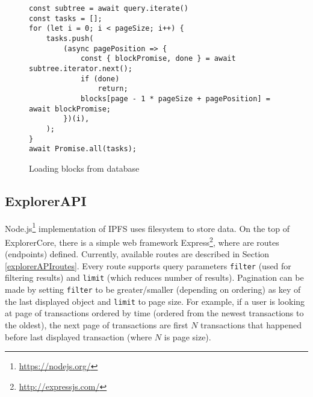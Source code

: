 \begin{figure}[h]
    \centering
    \begin{lstlisting}[style=ES6]
const subtree = await query.iterate()
const tasks = [];
for (let i = 0; i < pageSize; i++) {
    tasks.push(
        (async pagePosition => {
            const { blockPromise, done } = await subtree.iterator.next();
            if (done)
                return;
            blocks[page - 1 * pageSize + pagePosition] = await blockPromise;
        })(i),
    );
}
await Promise.all(tasks);
    \end{lstlisting}
    \caption{Loading blocks from database}
    \label{blocksLoading}
\end{figure}



\subsection{ExplorerAPI}
Node.js\footnote{\url{https://nodejs.org/}} implementation of IPFS uses filesystem to store data. On the top of ExplorerCore, there is a simple web framework Express\footnote{\url{http://expressjs.com/}}, where are routes (endpoints) defined. Currently, available routes are described in Section \ref{explorerAPIroutes}. Every route supports query parameters \texttt{filter} (used for filtering results) and \texttt{limit} (which reduces number of results). Pagination can be made by setting \texttt{filter} to be greater/smaller (depending on ordering) as key of the last displayed object and \texttt{limit} to page size. For example, if a user is looking at page of transactions ordered by time (ordered from the newest transactions to the oldest), the next page of transactions are first \(N\) transactions that happened before last displayed transaction (where \(N\) is page size).


